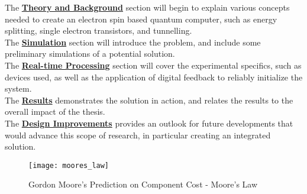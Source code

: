 \noindent The \hyperref[sec::theory]{\textbf{Theory and Background}} section will begin to explain various concepts needed to create an electron spin based quantum computer, such as energy splitting, single electron transistors, and tunnelling. \\
The \hyperref[sec::simulation]{\textbf{Simulation}} section will introduce the problem, and include some preliminary simulations of a potential solution. \\
The \hyperref[sec::real-time]{\textbf{Real-time Processing}} section will cover the experimental specifics, such as devices used, as well as the application of digital feedback to reliably initialize the system. \\
The \hyperref[sec::results]{\textbf{Results}} demonstrates the solution in action, and relates the results to the overall impact of the thesis. \\
The \hyperref[sec::future]{\textbf{Design Improvements}} provides an outlook for future developments that would advance this scope of research, in particular creating an integrated solution. \\


\begin{figure}[htbp!]
	\centering
	\texttt{[image: moores\_law]}
	\caption[Moore's Law]{Gordon Moore's Prediction on Component Cost - Moore's Law \cite{moore1965cramming}}
	\label{fig::moores_law}
\end{figure}
